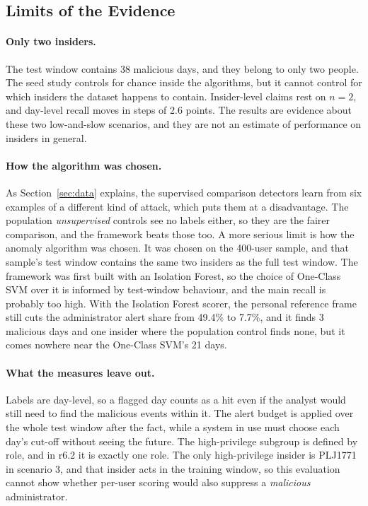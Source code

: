 \documentclass[a4paper,12pt]{article}
\begin{document}
\subsection{Limits of the Evidence}
\label{sec:threats}
\paragraph{Only two insiders.} The test window contains 38 malicious days, and they belong to only two people. The seed study controls for chance inside the algorithms, but it cannot control for which insiders the dataset happens to contain. Insider-level claims rest on $n=2$, and day-level recall moves in steps of 2.6 points. The results are evidence about these two low-and-slow scenarios, and they are not an estimate of performance on insiders in general.

\paragraph{How the algorithm was chosen.} As Section~\ref{sec:data} explains, the supervised comparison detectors learn from six examples of a different kind of attack, which puts them at a disadvantage. The population \emph{unsupervised} controls see no labels either, so they are the fairer comparison, and the framework beats those too. A more serious limit is how the anomaly algorithm was chosen. It was chosen on the 400-user sample, and that sample's test window contains the same two insiders as the full test window. The framework was first built with an Isolation Forest, so the choice of One-Class SVM over it is informed by test-window behaviour, and the main recall is probably too high. With the Isolation Forest scorer, the personal reference frame still cuts the administrator alert share from 49.4\% to 7.7\%, and it finds 3 malicious days and one insider where the population control finds none, but it comes nowhere near the One-Class SVM's 21 days.

\paragraph{What the measures leave out.} Labels are day-level, so a flagged day counts as a hit even if the analyst would still need to find the malicious events within it. The alert budget is applied over the whole test window after the fact, while a system in use must choose each day's cut-off without seeing the future. The high-privilege subgroup is defined by role, and in r6.2 it is exactly one role. The only high-privilege insider is PLJ1771 in scenario 3, and that insider acts in the training window, so this evaluation cannot show whether per-user scoring would also suppress a \emph{malicious} administrator.
\end{document}
